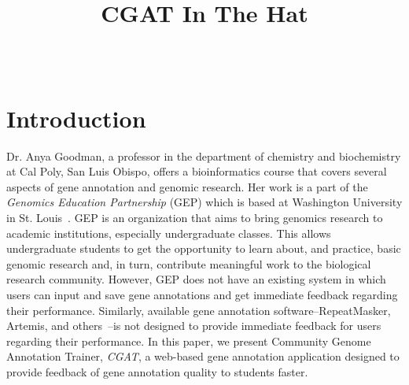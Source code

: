 \documentclass[10pt, conference, compsocconf]{IEEEtran}
\begin{document}
\title{CGAT In The Hat}


\author{
\\
}

\maketitle

\thispagestyle{empty}
\pagestyle{empty}

\section{Introduction}\label{sec:introduction}
Dr. Anya Goodman, a professor in the department of chemistry and biochemistry
at Cal Poly, San Luis Obispo, offers a bioinformatics course that covers
several aspects of gene annotation and genomic research. Her work is a part of
the \textit{Genomics Education Partnership} (GEP) which is based at Washington
University in St. Louis~\cite{gep}. GEP is an organization that aims to bring
genomics research to academic institutions, especially undergraduate classes.
This allows undergraduate students to get the opportunity to learn about, and
practice, basic genomic research and, in turn, contribute meaningful work to
the biological research community. However, GEP does not have an existing
system in which users can input and save gene annotations and get immediate
feedback regarding their performance. Similarly, available gene annotation
software--RepeatMasker, Artemis, and others~\cite{repeatmasker, artemis}--is
not designed to provide immediate feedback for users regarding their
performance. In this paper, we present Community Genome Annotation Trainer,
\textit{CGAT}, a web-based gene annotation application designed to provide
feedback of gene annotation quality to students faster.
\end{document}
